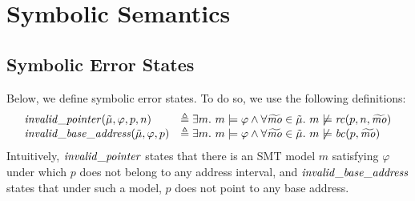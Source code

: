 \section{Symbolic Semantics}

\subsection{Symbolic Error States}
\label{appendix:symbolic-error-state}

Below, we define symbolic error states.
To do so, we use the following definitions:
\[
\begin{array}{ll}
\mathit{invalid\_pointer}(\tilde{\mu}, \varphi, p, n) & \triangleq \exists m. \
    m \models \varphi \land \forall \widetilde{\mathit{mo}} \in \tilde{\mu}. \ m \not \models \mathit{rc}(p, n, \widetilde{\mathit{mo}}) \\
\mathit{invalid\_base\_address}(\tilde{\mu}, \varphi, p) & \triangleq \exists m. \
    m \models \varphi \land \forall \widetilde{\mathit{mo}} \in \tilde{\mu}. \ m \not \models \mathit{bc}(p, \widetilde{\mathit{mo}})
\end{array}
\]
Intuitively,
$\mathit{invalid\_pointer}$ states that there is an SMT model $m$ satisfying $\varphi$ under which $p$ does not belong to any address interval,
and $\mathit{invalid\_base\_address}$ states that under such a model, $p$ does not point to any base address.

